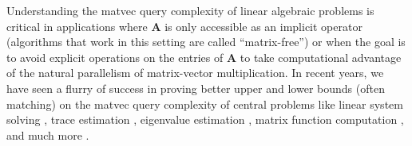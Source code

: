 \documentclass{article}[11pt]
\theoremstyle{definition}
\newcommand{\bv}[1]{\boldsymbol{\mathbf{#1}}}
\begin{document}
Understanding the matvec query complexity of linear algebraic problems is critical in applications where $\bv{A}$ is only accessible as an implicit operator (algorithms that work in this setting are called ``matrix-free'') or when the goal is to avoid explicit operations on the entries of $\bv{A}$ to take computational advantage of the natural parallelism of matrix-vector multiplication. In recent years, we have seen a flurry of success in proving better upper and lower bounds (often matching) on the matvec query complexity of central problems like linear system solving \cite{BravermanHazanSimchowitz:2020}, trace estimation \cite{MeyerMuscoMusco:2021,WoodruffZhangZhang:2022,EpperlyTroppWebber:2024,ChenChenLi:2024}, eigenvalue estimation \cite{SimchowitzEl-AlaouiRecht:2018,ChenTrogdonUbaru:2021,BravermanKrishnanMusco:2022,MuscoMuscoRosenblatt:2025,BhattacharjeeJayaramMusco:2025}, matrix function computation \cite{ChewiDios-PontLi:2024}, and much more \cite{SunWoodruffYang:2019,MeyerSwartworthWoodruff:2025}. 
\end{document}

